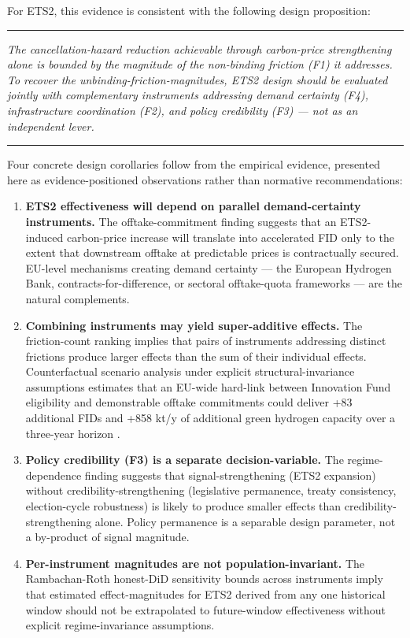 \documentclass[11pt,a4paper]{article}
\begin{document}
For ETS2, this evidence is consistent with the following design proposition:

\medskip
\hrule
\vspace{0.4em}
\textit{The cancellation-hazard reduction achievable through carbon-price strengthening alone is bounded by the magnitude of the non-binding friction (F1) it addresses. To recover the unbinding-friction-magnitudes, ETS2 design should be evaluated jointly with complementary instruments addressing demand certainty (F4), infrastructure coordination (F2), and policy credibility (F3) --- not as an independent lever.}
\vspace{0.2em}
\hrule
\medskip

\vspace{0.4em}

Four concrete design corollaries follow from the empirical evidence, presented here as evidence-positioned observations rather than normative recommendations:

\begin{enumerate}
\item \textbf{ETS2 effectiveness will depend on parallel demand-certainty instruments.} The offtake-commitment finding suggests that an ETS2-induced carbon-price increase will translate into accelerated FID only to the extent that downstream offtake at predictable prices is contractually secured. EU-level mechanisms creating demand certainty --- the European Hydrogen Bank, contracts-for-difference, or sectoral offtake-quota frameworks --- are the natural complements.

\item \textbf{Combining instruments may yield super-additive effects.} The friction-count ranking implies that pairs of instruments addressing distinct frictions produce larger effects than the sum of their individual effects. Counterfactual scenario analysis under explicit structural-invariance assumptions estimates that an EU-wide hard-link between Innovation Fund eligibility and demonstrable offtake commitments could deliver +83 additional FIDs and +858 kt/y of additional green hydrogen capacity over a three-year horizon \cite{saakstra2026thesis}.

\item \textbf{Policy credibility (F3) is a separate decision-variable.} The regime-dependence finding suggests that signal-strengthening (ETS2 expansion) without credibility-strengthening (legislative permanence, treaty consistency, election-cycle robustness) is likely to produce smaller effects than credibility-strengthening alone. Policy permanence is a separable design parameter, not a by-product of signal magnitude.

\item \textbf{Per-instrument magnitudes are not population-invariant.} The Rambachan-Roth honest-DiD sensitivity bounds across instruments imply that estimated effect-magnitudes for ETS2 derived from any one historical window should not be extrapolated to future-window effectiveness without explicit regime-invariance assumptions.
\end{enumerate}
\end{document}
